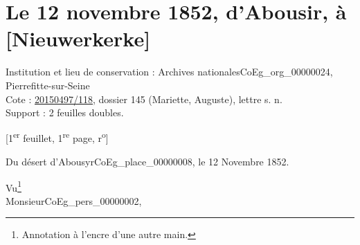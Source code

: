 \documentclass{book}
\begin{document}
\section*{Le 12 novembre 1852, d'Abousir, à [Nieuwerkerke]} \label{CoEg_Mariette_1852-11-12} 
{\footnotesize
\noindent Institution et lieu de conservation : Archives nationales\gls{CoEg_org_00000024}, Pierrefitte-sur-Seine\\
Cote : \hyperref[CoEg_Mariette_ms_001]{20150497/118}, dossier 145 (Mariette, Auguste), lettre s. n.\\
Support : 2 feuilles doubles.
\begin{center} {[1\textsuperscript{er} feuillet, 1\textsuperscript{re} page, r\textsuperscript{o}]}\end{center}}
\begin{flushright}Du désert d’Abousyr\gls{CoEg_place_00000008}, le 12 Novembre 1852.\end{flushright}
Vu\footnote{Annotation à l'encre d'une autre main.}\\

\hspace{1cm}Monsieur\gls{CoEg_pers_00000002},\\
\end{document}
